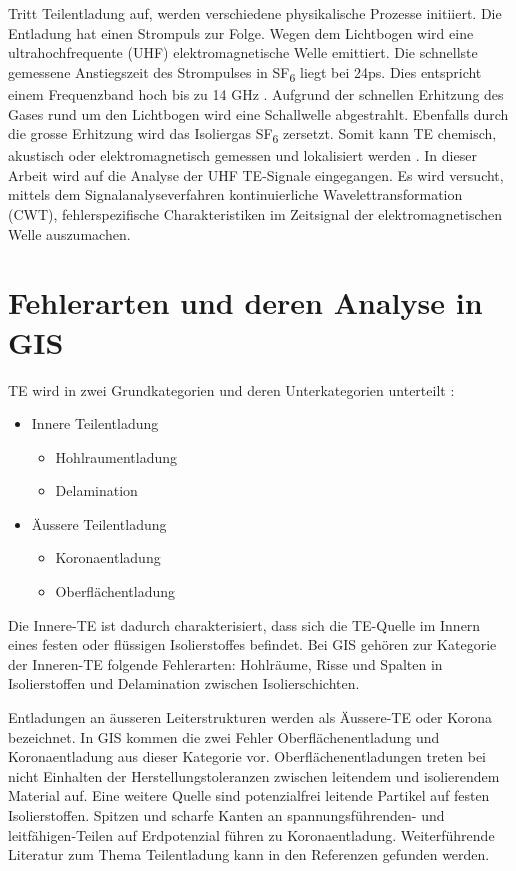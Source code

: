 \begin{refsection}
Tritt Teilentladung auf, werden verschiedene  physikalische Prozesse initiiert. 
Die Entladung hat einen Strompuls zur Folge.
Wegen dem Lichtbogen wird eine ultrahochfrequente (UHF) elektromagnetische Welle emittiert.
Die schnellste gemessene Anstiegszeit des Strompulses in SF\textsubscript{6} liegt bei 24ps.
Dies entspricht einem Frequenzband hoch bis zu 14 GHz \cite{skript:Judd24ps}. 
Aufgrund der schnellen Erhitzung des Gases rund um den Lichtbogen wird eine Schallwelle abgestrahlt. 
Ebenfalls durch die grosse Erhitzung wird das Isoliergas SF\textsubscript{6} zersetzt. 
Somit kann TE chemisch, akustisch oder elektromagnetisch gemessen und lokalisiert werden \cite{skript:StatusReviewPDMeasurement}.
In dieser Arbeit wird auf die Analyse der UHF TE-Signale eingegangen.
Es wird versucht, mittels dem Signalanalyseverfahren kontinuierliche Wavelettransformation (CWT), fehlerspezifische Charakteristiken im Zeitsignal der elektromagnetischen Welle auszumachen.

\section{Fehlerarten und deren Analyse in GIS}

TE wird in zwei Grundkategorien und deren Unterkategorien unterteilt \cite{buch:Kuchler}: 
\begin{itemize}
	\item Innere Teilentladung
	 \begin{itemize}
	 	\item Hohlraumentladung
	 	\item Delamination
	\end{itemize}
	\item Äussere Teilentladung
	\begin{itemize}
		\item Koronaentladung
		\item Oberflächentladung
	\end{itemize}
\end{itemize}
Die Innere-TE ist dadurch charakterisiert, dass sich die TE-Quelle im Innern eines festen oder flüssigen Isolierstoffes befindet. 
Bei GIS gehören zur Kategorie der Inneren-TE folgende Fehlerarten: Hohlräume, Risse und Spalten in Isolierstoffen und Delamination zwischen Isolierschichten.
 
Entladungen an äusseren Leiterstrukturen werden als Äussere-TE oder Korona bezeichnet. 
In GIS kommen die zwei Fehler Oberflächenentladung und Koronaentladung aus dieser Kategorie vor.
Oberflächenentladungen treten bei nicht Einhalten der Herstellungstoleranzen zwischen leitendem und isolierendem Material auf.
Eine weitere Quelle sind potenzialfrei leitende Partikel auf festen Isolierstoffen.
Spitzen und scharfe Kanten an spannungsführenden- und leitfähigen-Teilen auf Erdpotenzial führen zu Koronaentladung.
Weiterführende Literatur zum Thema Teilentladung kann in den Referenzen \cite{buch:Kuchler,skript:InnereTE,skript:AeussreTE} gefunden werden.


\end{refsection}
